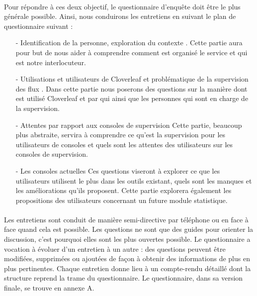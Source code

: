 			\paragraph{}%
			Pour répondre à ces deux objectif, le questionnaire d’enquête doit être le
			plus générale possible. Ainsi, nous conduirons les entretiens en suivant le
			plan de questionnaire suivant :
			\begin{itemize}
			  \item[- Identification de la personne, exploration du contexte] . Cette
			  partie aura pour but de nous aider à comprendre comment est organisé le
			  service et qui est notre interlocuteur.
			  \item[- Utilisations et utilisateurs de Cloverleaf et problématique de la
			  supervision des flux] . Dans cette partie nous poserons des questions sur
			  la manière dont est utilisé Cloverleaf et par qui ainsi que les personnes
			  qui sont en charge de la supervision.
			  \item[- Attentes par rapport aux consoles de supervision] Cette partie,
			  beaucoup plus abstraite, servira à comprendre ce qu’est la supervision
			  pour les utilisateurs de consoles et quels sont les attentes des
			  utilisateurs sur les consoles de supervision.
			  \item[- Les consoles actuelles] Ces questions viseront à explorer ce que
			  les utilisateurs utilisent le plus dans les outils existant, quels sont
			  les manques et les améliorations qu’ils proposent. Cette partie explorera
			  également les propositions des utilisateurs concernant un future module
			  statistique.
			\end{itemize}
			
			\paragraph{}%
			Les entretiens sont conduit de manière semi-directive par téléphone ou en
			face à face quand cela est possible.
			Les questions ne sont que des guides pour orienter la discussion, c’est
			pourquoi elles sont les plus ouvertes possible.\newline
			Le questionnaire a vocation à évoluer d’un entretien à un autre : des
			questions peuvent être modifiées, supprimées ou ajoutées de façon à obtenir
			des informations de plus en plus pertinentes. Chaque entretien donne lieu à
			un compte-rendu détaillé dont la structure reprend la trame du
			questionnaire. Le questionnaire, dans sa version finale, se trouve en annexe
			A.
			
